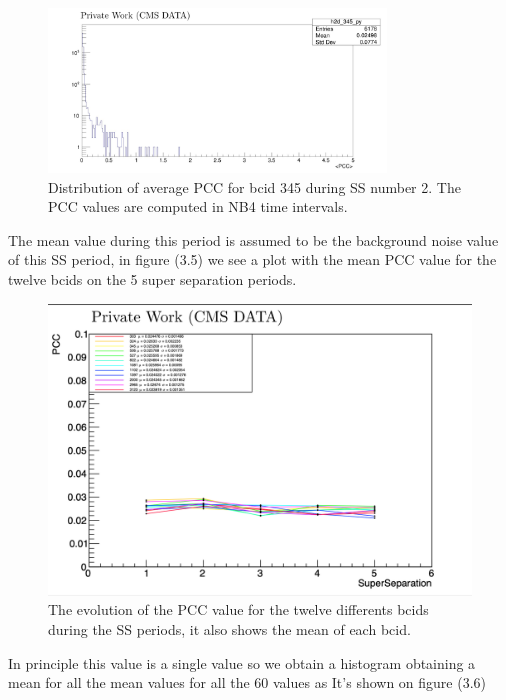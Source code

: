 \begin{figure}[H]
    \centering
    \includegraphics[height=0.45\textheight, width=0.8\textwidth]{sshist.png}
    \caption[Average PCC bcid 345.]{Distribution of average PCC for bcid 345 during SS number 2. The PCC values are computed in NB4 time intervals.}
    \label{fig:SShist}
\end{figure}


The mean value during this period is assumed to be the background noise value of this SS period, in figure (3.5) we see a plot with the mean PCC value for the twelve bcids on the 5 super separation periods.

\begin{figure}[H]
    \centering
    \includegraphics[width=1\textwidth]{SSmean.png}
    \caption[PCC evolution during SS periods.]{The evolution of the PCC value for the twelve differents bcids during the SS periods, it also shows the mean of each bcid.}
    \label{fig:SSmean}
\end{figure}

In principle this value is a single value so we obtain a histogram obtaining a mean for all the mean values for all the 60 values as It's shown on figure (3.6)


